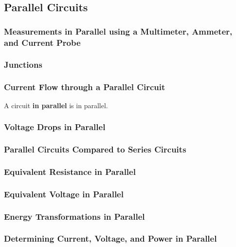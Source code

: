 \documentclass[dvipsnames]{article}
\begin{document}
\subsection{Parallel Circuits}

\subsubsection{Measurements in Parallel using a Multimeter, Ammeter, and Current Probe}

\subsubsection{Junctions}

\subsubsection{Current Flow through a Parallel Circuit}

A circuit \textbf{\gls{in parallel}} is \glsdesc{in parallel}.

\subsubsection{Voltage Drops in Parallel}

\subsubsection{Parallel Circuits Compared to Series Circuits}

\subsubsection{Equivalent Resistance in Parallel}

\subsubsection{Equivalent Voltage in Parallel}

\subsubsection{Energy Transformations in Parallel}

\subsubsection{Determining Current, Voltage, and Power in Parallel}
\end{document}
